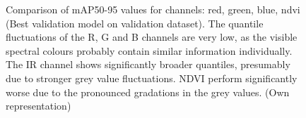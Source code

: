 \begin{figure}[htbp]
    \centering
    
    \caption[Comparison of \acrshort{mAP}50-95 values for channels: red, green, blue, ndvi (Best validation model on validation dataset)]{Comparison of \acrshort{mAP}50-95 values for channels: red, green, blue, ndvi (Best validation model on validation dataset). The quantile fluctuations of the R, G and B channels are very low, as the visible spectral colours probably contain similar information individually. The IR channel shows significantly broader quantiles, presumably due to stronger grey value fluctuations. NDVI perform significantly worse due to the pronounced gradations in the grey values. (Own representation)}
    \label{fig:ablation_map50-95:val_on_val}
\end{figure}

